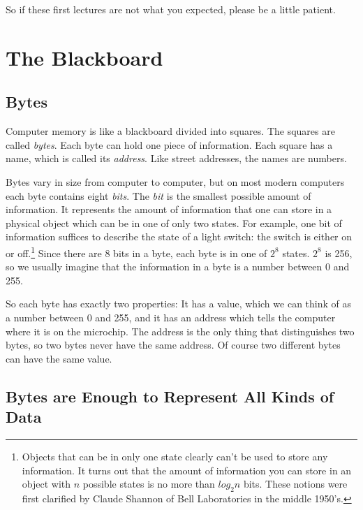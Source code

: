     So if these first lectures are not what you expected, please be a
little patient.

\section{The Blackboard}

\subsection{Bytes}

    Computer memory is like a blackboard divided into squares.  The
squares are called {\em bytes}\/. Each byte can hold one piece of
information.  Each square has a name, which is called its {\em
address}\/.  Like street addresses, the names are numbers.

    Bytes vary in size from computer to computer, but on most modern
computers each byte contains eight {\em bits}.  The {\em bit}\/ is the
smallest possible amount of information.  It represents the amount of
information that one can store in a physical object which can be in one
of only two states.  For example, one bit of information suffices to
describe the state of a light switch: the switch is either on or
off.\footnote{Objects that can be in only one state clearly can't be
used to store any information.  It turns out that the amount of
information you can store in an object with $n$ possible states is no
more than $log_2 n$ bits.  These notions were first clarified by Claude
Shannon of Bell Laboratories in the middle 1950's.} Since there are 8
bits in a byte, each byte is in one of $2^8$ states.  $2^8$ is 256, so
we usually imagine that the information in a byte is a number between 0
and 255.

    So each byte has exactly two properties: It has a value, which we
can think of as a number between 0 and 255, and it has an address which
tells the computer where it is on the microchip.  The address is the
only thing that distinguishes two bytes, so two bytes never have the
same address.  Of course two different bytes can have the same value.


\subsection{Bytes are Enough to Represent All Kinds of Data}

